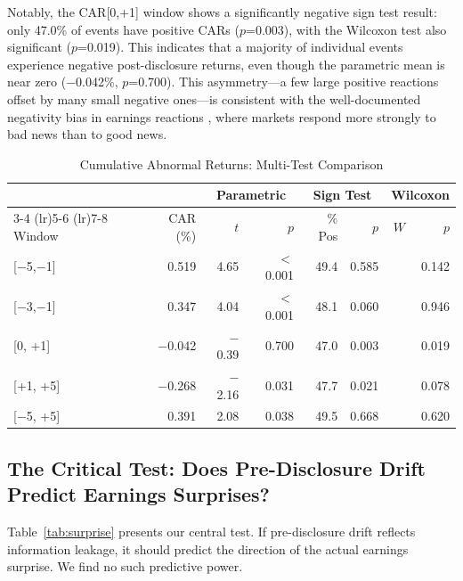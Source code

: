 \documentclass[review,authoryear]{elsarticle}
\begin{document}
Notably, the CAR[0,+1] window shows a significantly negative sign test result: only 47.0\% of events have positive CARs ($p$=0.003), with the Wilcoxon test also significant ($p$=0.019). This indicates that a majority of individual events experience negative post-disclosure returns, even though the parametric mean is near zero ($-$0.042\%, $p$=0.700). This asymmetry---a few large positive reactions offset by many small negative ones---is consistent with the well-documented negativity bias in earnings reactions \citep{skinner1994investment}, where markets respond more strongly to bad news than to good news.

\begin{table}[H]
\centering
\caption{Cumulative Abnormal Returns: Multi-Test Comparison}
\label{tab:car}
\begin{tabular}{lrrrrrrr}
\toprule
& & \multicolumn{2}{c}{Parametric} & \multicolumn{2}{c}{Sign Test} & \multicolumn{2}{c}{Wilcoxon} \\
\cmidrule(lr){3-4} \cmidrule(lr){5-6} \cmidrule(lr){7-8}
Window & CAR (\%) & $t$ & $p$ & \% Pos & $p$ & $W$ & $p$ \\
\midrule
{[}$-$5,$-$1{]} & 0.519 & 4.65 & $<$0.001 & 49.4 & 0.585 & & 0.142 \\
{[}$-$3,$-$1{]} & 0.347 & 4.04 & $<$0.001 & 48.1 & 0.060 & & 0.946 \\
{[}0, +1{]} & $-$0.042 & $-$0.39 & 0.700 & 47.0 & 0.003 & & 0.019 \\
{[}+1, +5{]} & $-$0.268 & $-$2.16 & 0.031 & 47.7 & 0.021 & & 0.078 \\
{[}$-$5, +5{]} & 0.391 & 2.08 & 0.038 & 49.5 & 0.668 & & 0.620 \\
\bottomrule
\end{tabular}
\end{table}

\subsection{The Critical Test: Does Pre-Disclosure Drift Predict Earnings Surprises?}

Table~\ref{tab:surprise} presents our central test. If pre-disclosure drift reflects information leakage, it should predict the direction of the actual earnings surprise. We find no such predictive power.
\end{document}
